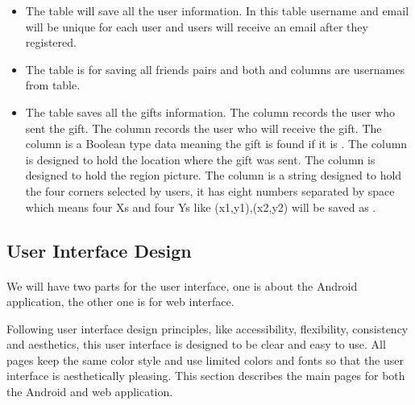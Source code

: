 \begin{itemize}
\item The  table will save all the user information. In this table username and email will be unique for each user and users will receive an email after they registered.
\item The  table is for saving all friends pairs and both  and  columns are usernames from  table.
\item The  table saves all the gifts information. The  column records the user who sent the gift. The  column records the user who will receive the gift. The  column is a Boolean type data meaning the gift is found if it is . The  column is designed to hold the location where the gift was sent. The  column is designed to hold the region picture. The  column is a string designed to hold the four corners selected by users, it has eight numbers separated by space which means four Xs and four Ys like (x1,y1),(x2,y2) will be saved as .
\end{itemize}

\subsection{User Interface Design}
\paragraph{} We will have two parts for the user interface, one is about the Android application, the other one is for web interface.
\par Following user interface design principles, like accessibility, flexibility, consistency and aesthetics, this user interface is designed to be clear and easy to use. All pages keep the same color style and use limited colors and fonts so that the user interface is aesthetically pleasing.\cite{galitz2007} This section describes the main pages for both the Android and web application.
